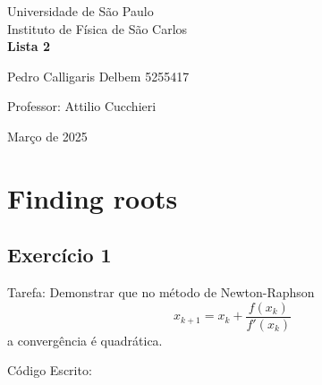 \documentclass[12pt, a4paper]{article} %
\begin{document}
	
	\begin{titlepage}
		\begin{center}
\Huge{Universidade de São Paulo}\\
\large{Instituto de Física de São Carlos}\\
\vspace{20pt}
\vspace{200pt}
\textbf{Lista 2}\\
\vspace{8cm}
		\end{center}

\begin{flushleft}
\begin{tabbing}
Pedro Calligaris Delbem 5255417\\
\end{tabbing}
\vspace{0.5cm}
Professor: Attilio Cucchieri\\		
		\end{flushleft}
	
		\begin{center}
			\vspace{\fill}
	Março de 2025	
		\end{center}
	\end{titlepage}

	\tableofcontents 
	\thispagestyle{empty}
	\newpage

\section{Finding roots}

    \subsection{Exerc\'icio 1}

        Tarefa: Demonstrar que no m\'etodo de Newton-Raphson
        \begin{equation}
            x_{k+1} = x_{k} + \frac{f(x_{k})}{f'(x_{k})}
        \end{equation}
        a converg\^encia \'e quadr\'atica.

        C\'odigo Escrito:
        
\end{document}
